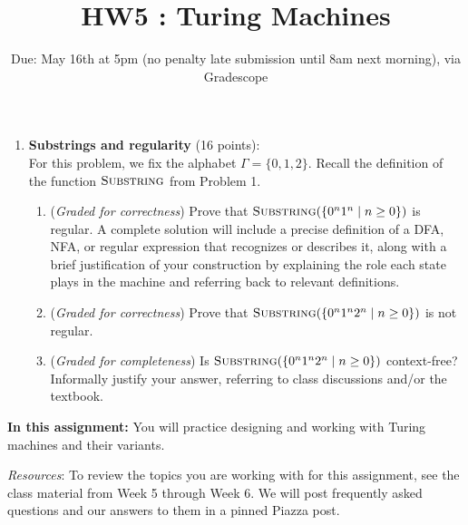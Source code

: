 \documentclass[12pt, oneside]{article}
\newcommand{\gradeCorrect}{({\it Graded for correctness}) }
\newcommand{\gradeComplete}{({\it Graded for completeness}) }
\newcommand{\SUBSTRING}{\textsc{Substring}}
\newcommand{\REP}{\textsc{Rep}}
\begin{document}
\begin{enumerate}
\begin{enumerate}
    \item\gradeCorrect $\REP(\{0^n1^n \mid n \ge 0\})$

    \item\gradeCorrect $\{1^n = 1^a + 1^b \in \{1,=,+\}^* \mid a,b,n \ge 1 \text{ such that } a + b = n \}$
\end{enumerate}

\item \textbf{Substrings and regularity} (16 points): \\
For this problem, we fix the 
alphabet $\Gamma = \{0,1,2\}$. Recall the 
definition of the function $\SUBSTRING$ from 
Problem 1.
\begin{enumerate}
\item\gradeCorrect Prove that $\SUBSTRING(\{ 0^n 1^n \mid n \ge 0\})$ is regular.
A complete 
solution will include a 
precise definition of a DFA, NFA, or regular 
expression that recognizes or describes it, along 
with a brief justification
of your construction by explaining the role each 
state plays in the machine
and referring back to relevant definitions.
\item\gradeCorrect Prove that 
$\SUBSTRING(\{ 0^n 1^n 2^n \mid n \ge 0\})$
is not regular.
\item\gradeComplete Is  $\SUBSTRING(\{ 0^n 1^n 2^n \mid n \ge 0\})$
context-free?
Informally justify your answer, referring 
to class discussions and/or the textbook.

\end{enumerate}
\end{enumerate}

\newpage

\newcommand{\corrupted}{\text{\lightning}}

\title{HW5 : Turing Machines}
\date{Due: May 16th at 5pm (no penalty late submission until 8am next morning), via Gradescope}


\maketitle
\thispagestyle{fancy}

\textbf{In this assignment:} You will practice designing and working with Turing machines and their variants.

\textit{Resources}: To review the topics you are working with for this assignment, 
see the class material from Week 5 through Week 6. We will post frequently asked questions 
and our answers to them in a pinned Piazza post.
\end{document}
